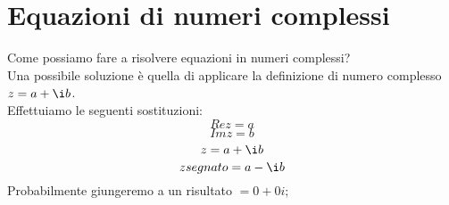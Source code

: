 \documentclass{article}
\begin{document}
\section{Equazioni di numeri complessi}
Come possiamo fare a risolvere equazioni in numeri complessi?\\
Una possibile soluzione è quella di applicare la definizione di numero complesso \(z = a + \i b\).\\
Effettuiamo le seguenti sostituzioni:
\[Re z = a\]
\[Im z = b\]
\[z = a + \i b\]
\[zsegnato = a - \i b\]
Probabilmente giungeremo a un risultato \(= 0 + 0i\); 
\end{document}
